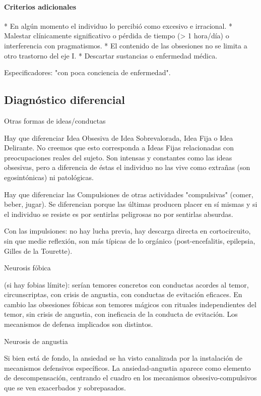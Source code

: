 \paragraph{Criterios adicionales}
* En algún momento el individuo lo percibió como excesivo e irracional.
* Malestar clínicamente significativo o pérdida de tiempo (> 1 hora/día) o interferencia con pragmatismos.
* El contenido de las obsesiones no se limita a otro trastorno del eje I.
* Descartar sustancias o enfermedad médica.

Especificadores: "con poca conciencia de enfermedad".

\subsection*{Diagnóstico diferencial}

Otras formas de ideas/conductas

Hay que diferenciar Idea Obsesiva de Idea Sobrevalorada, Idea Fija o Idea Delirante. No creemos que esto corresponda a Ideas Fijas relacionadas con preocupaciones reales del sujeto. Son intensas y constantes como las ideas obsesivas, pero a diferencia de éstas el individuo no las vive como extrañas (son egosintónicas) ni patológicas.

Hay que diferenciar las Compulsiones de otras actividades "compulsivas" (comer, beber, jugar). Se diferencian porque las últimas producen placer en sí mismas y si el individuo se resiste es por sentirlas peligrosas no por sentirlas absurdas.

Con las impulsiones: no hay lucha previa, hay descarga directa en cortocircuito, sin que medie reflexión, son más típicas de lo orgánico (post-encefalitis, epilepsia, Gilles de la Tourette).

Neurosis fóbica

(si hay fobias límite): serían temores concretos con conductas acordes al temor, circunscriptas, con crisis de angustia, con conductas de evitación eficaces. En cambio las obsesiones fóbicas son temores mágicos con rituales independientes del temor, sin crisis de angustia, con ineficacia de la conducta de evitación. Los mecanismos de defensa implicados son distintos.

Neurosis de angustia

Si bien está de fondo, la ansiedad se ha visto canalizada por la instalación de mecanismos defensivos específicos. La ansiedad-angustia aparece como elemento de descompensación, centrando el cuadro en los mecanismos obsesivo-compulsivos que se ven exacerbados y sobrepasados.

